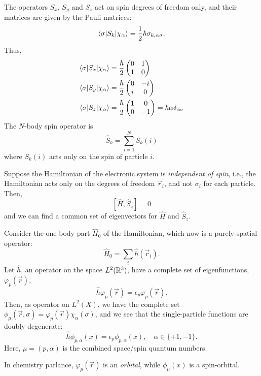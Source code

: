\documentclass{report}
\theoremstyle{plain}
\theoremstyle{definition}
\begin{document}
The operators $S_x$, $S_y$ and $S_z$ act on spin degrees of freedom
only, and their matrices are given by the Pauli matrices:
\[ \braket{\sigma|S_k|\chi_\alpha} = \frac{1}{2}\hbar
\sigma_{k,\alpha\sigma}. \]
Thus,
\begin{align}
 \braket{\sigma|S_x|\chi_\alpha} &= \frac{\hbar}{2}\begin{pmatrix} 0 & 1
  \\ 1 & 0 \end{pmatrix}  \\
 \braket{\sigma|S_y|\chi_\alpha} &= \frac{\hbar}{2}\begin{pmatrix} 0 & -i
  \\ i & 0 \end{pmatrix}  \\
 \braket{\sigma|S_z|\chi_\alpha} &= \frac{\hbar}{2}\begin{pmatrix} 1 & 0
  \\ 0 & -1 \end{pmatrix} = \hbar\alpha\delta_{\alpha\sigma}
\end{align}
The $N$-body spin operator is
\begin{equation}
  \hat{S}_k = \sum_{i=1}^N S_k(i)
\end{equation}
where $S_k(i)$ acts only on the spin of particle $i$.

Suppose the Hamiltonian of the electronic system is \emph{independent
  of spin}, i.e., the Hamiltonian acts only on the degrees of freedom
$\vec{r}_i$, and not $\sigma_i$ for each particle. Then,
\[ [\hat{H}, \hat{S}_z] = 0 \]
and we can find a common set of eigenvectors for $\hat{H}$ and $\hat{S}_z$.

Consider the one-body part $\hat{H}_0$ of the Hamiltonian, which now
is a purely spatial operator:
\begin{equation}
  \hat{H}_0 = \sum_i \hat{h}(\vec{r}_i).
\end{equation}
Let $\hat{h}$, an operator on the space $L^2(\mathbb{R}^3)$, have a complete set of eigenfunctions,
$\varphi_p(\vec{r})$,
\[ \hat{h}\varphi_p(\vec{r}) = \epsilon_p \varphi_p(\vec{r}).\]
Then, as operator on $L^2(X)$, we have the
complete set $\phi_\mu(\vec{r},\sigma) =
\varphi_p(\vec{r})\chi_\alpha(\sigma)$, and we see that the
single-particle functions are doubly degenerate:
\[ \hat{h}\phi_{p,\alpha}(x) = \epsilon_p \phi_{p,\alpha}(x), \quad
\alpha \in \{+1,-1\}. \]
Here, $\mu = (p,\alpha)$ is the combined space/spin quantum numbers. 

In chemistry parlance, $\varphi_p(\vec{r})$ is an \emph{orbital},
while $\phi_\mu(x)$ is a spin-orbital. 
\end{document}
